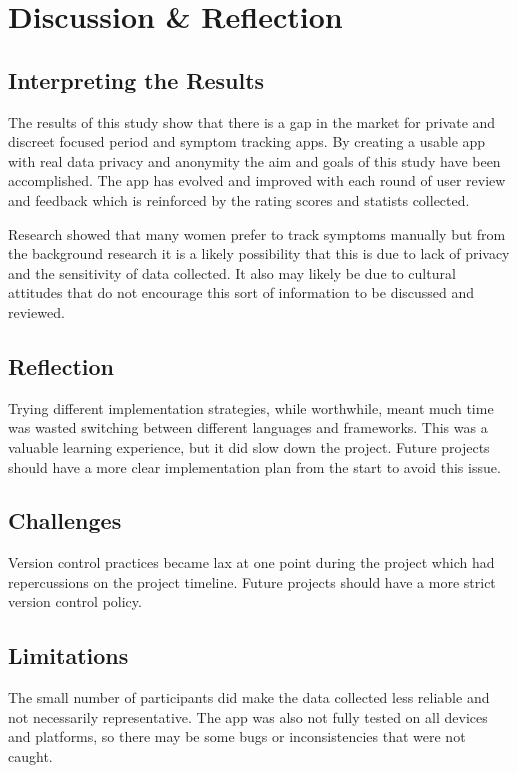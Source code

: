 \section{Discussion \& Reflection}

\subsection{Interpreting the Results}
The results of this study show that there is a gap in the market for private and discreet focused period and symptom tracking apps. By creating a usable app with real data privacy and anonymity the aim and goals of this study have been accomplished. The app has evolved and improved with each round of user review and feedback which is reinforced by the rating scores and statists collected. 

Research showed that many women prefer to track symptoms manually but from the background research it is a likely possibility that this is due to lack of privacy and the sensitivity of data collected. It also may likely be due to cultural attitudes that do not encourage this sort of information to be discussed and reviewed.

\subsection{Reflection}
Trying different implementation strategies, while worthwhile, meant much time was wasted switching between different languages and frameworks. This was a valuable learning experience, but it did slow down the project. Future projects should have a more clear implementation plan from the start to avoid this issue.

\subsection{Challenges}
Version control practices became lax at one point during the project which had repercussions on the project timeline. Future projects should have a more strict version control policy. 

\subsection{Limitations}
The small number of participants did make the data collected less reliable and not necessarily representative. The app was also not fully tested on all devices and platforms, so there may be some bugs or inconsistencies that were not caught.

